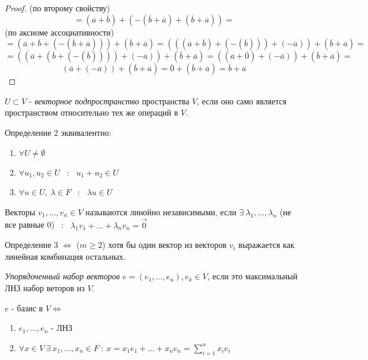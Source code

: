 \begin{definition}
\begin{proof}
      (по второму свойству) 
      $$ = (\overline{a}+\overline{b})+(-(\overline{b}+\overline{a})+(\overline{b}+\overline{a})) = $$ 
      (по аксиоме ассоциативности) 
      $$=(\overline{a}+\overline{b}+(-(\overline{b}+\overline{a})))+(\overline{b}+\overline{a}) = (((\overline{a}+\overline{b})+(-(\overline{b})))+(-\overline{a}))+(\overline{b}+\overline{a}) = $$
      $$= ((\overline{a}+(\overline{b}+(-(\overline{b}))))+(-\overline{a}))+(\overline{b}+\overline{a}) =
      ((\overline{a}+\overline{0})+(-\overline{a}))+(\overline{b}+\overline{a}) =$$
      $$(\overline{a}+(-\overline{a}))+(\overline{b}+\overline{a})
      = \overline{0}+(\overline{b}+\overline{a}) = \overline{b}+\overline{a}$$
    \end{proof} 
  \end{definition}
  \begin{definition}
    $U \subset  V$ - \textit{векторное подпространство} пространства $V$, если оно само является пространством относительно тех же операций в $V$. 
  \end{definition}
  \begin{subtheorem}
    Определение 2 эквивалентно:
    \begin{enumerate}
      \item $\forall U\neq \emptyset $
      \item $\forall u_1, u_2 \in U$ \ : \  $u_1 + u_2 \in U$
      \item $\forall u \in U, \ \lambda \in F$ \ : \ $\lambda u\in U$
    \end{enumerate}
  \end{subtheorem} 
  \begin{definition}
    Векторы $v_1,...,v_n \in V$ называются линойно независимыми, если $\exists \ \lambda_1,..., \lambda_n$ (не все равные 0) \ : \ $\lambda_1v_1+...+\lambda_nv_n = \vec 0$
  \end{definition} 
  \begin{subtheorem}
    Определение 3 $\Longleftrightarrow $ ($m\geq 2$) хотя бы один вектор из векторов $v_i$ выражается как линейная комбинация остальных. 
  \end{subtheorem}
  \begin{definition}
    \textit{Упорядоченный набор векторов} $e = (e_1,...,e_n), e_k \in V$, если это максимальный ЛНЗ набор веторов из $V$.  
  \end{definition} 
  \begin{subtheorem}
    $e$ - базис в $V \Longleftrightarrow$
    \begin{enumerate}
      \item $e_1,...,e_n$ - ЛНЗ
      \item $\forall x \in V \ \exists \ x_1,...,x_n \in F \ : \ x = x_1e_1+...+x_ne_n = \sum \limits_{i=1}^nx_ie_i $ 
    \end{enumerate}
  \end{subtheorem} 
